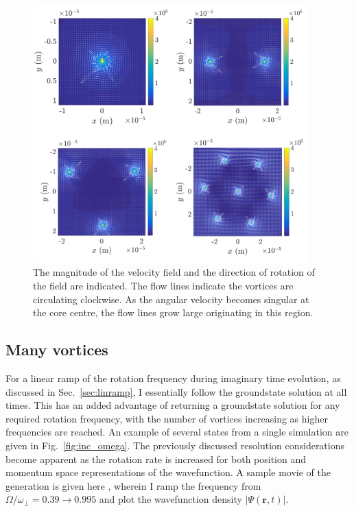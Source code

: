\begin{figure}\centering
    \includegraphics[width=0.95\textwidth]{Images/ch4_vtx/velocity/velocity.pdf}
    \caption{The magnitude of the velocity field and the direction of rotation of the field are indicated. The flow lines indicate the vortices are circulating clockwise. As the angular velocity becomes singular at the core centre, the flow lines grow large originating in this region.}
    \label{fig:vel_field}
\end{figure}



\subsection{Many vortices}

For a linear ramp of the rotation frequency during imaginary time evolution, as discussed in Sec.~\ref{sec:linramp}, I essentially follow the groundstate solution at all times. This has an added advantage of returning a groundstate solution for any required rotation frequency, with the number of vortices increasing as higher frequencies are reached. An example of several states from a single simulation are given in Fig.~\ref{fig:inc_omega}. The previously discussed resolution considerations become apparent as the rotation rate is increased for both position and momentum space representations of the wavefunction. A sample movie of the generation is given here \cite{MLXD:movie_groundstates}, wherein I ramp the frequency from $\Omega/\omega_\perp = 0.39 \to 0.995$ and plot the wavefunction density $|\Psi(\mathbf{r},t)|$.

